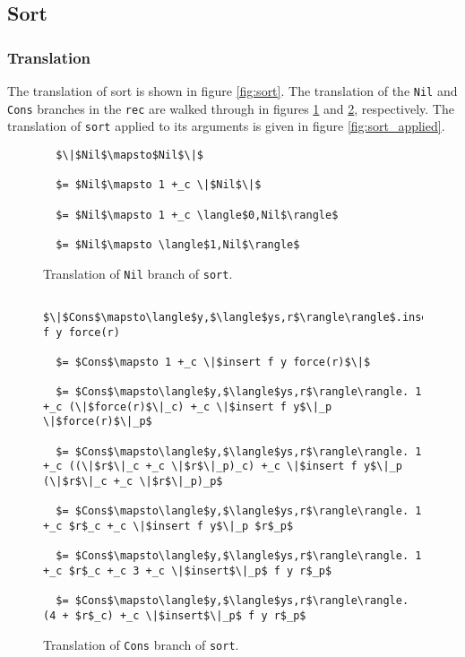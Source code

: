 \documentclass[12pt,letterpaper]{article}
\newcommand{\T}[1]{\texttt{#1}}
\begin{document}
\subsection{Sort}

\subsubsection{Translation}
The translation of sort is shown in figure \ref{fig:sort}.
The translation of the \T{Nil} and \T{Cons} branches in the \T{rec} are walked through in figures \ref{fig:sort_nil} and \ref{fig:sort_cons}, respectively.
The translation of \T{sort} applied to its arguments is given in figure \ref{fig:sort_applied}.

\begin{figure}[H]
  \caption{Translation of \T{Nil} branch of \T{sort}.}
  \label{fig:sort_nil}
  \begin{lstlisting}
  $\|$Nil$\mapsto$Nil$\|$

  $= $Nil$\mapsto 1 +_c \|$Nil$\|$

  $= $Nil$\mapsto 1 +_c \langle$0,Nil$\rangle$

  $= $Nil$\mapsto \langle$1,Nil$\rangle$
  \end{lstlisting}
\end{figure}

\begin{figure}[H]
  \caption{Translation of \T{Cons} branch of \T{sort}.}
  \label{fig:sort_cons}
  \begin{lstlisting}
  $\|$Cons$\mapsto\langle$y,$\langle$ys,r$\rangle\rangle$.insert f y force(r)

  $= $Cons$\mapsto 1 +_c \|$insert f y force(r)$\|$

  $= $Cons$\mapsto\langle$y,$\langle$ys,r$\rangle\rangle. 1 +_c (\|$force(r)$\|_c) +_c \|$insert f y$\|_p \|$force(r)$\|_p$

  $= $Cons$\mapsto\langle$y,$\langle$ys,r$\rangle\rangle. 1 +_c ((\|$r$\|_c +_c \|$r$\|_p)_c) +_c \|$insert f y$\|_p (\|$r$\|_c +_c \|$r$\|_p)_p$

  $= $Cons$\mapsto\langle$y,$\langle$ys,r$\rangle\rangle. 1 +_c $r$_c +_c \|$insert f y$\|_p $r$_p$

  $= $Cons$\mapsto\langle$y,$\langle$ys,r$\rangle\rangle. 1 +_c $r$_c +_c 3 +_c \|$insert$\|_p$ f y r$_p$

  $= $Cons$\mapsto\langle$y,$\langle$ys,r$\rangle\rangle. (4 + $r$_c) +_c \|$insert$\|_p$ f y r$_p$

  \end{lstlisting}
\end{figure}
\end{document}
